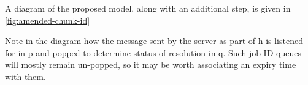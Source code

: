 A diagram of the proposed model, along with an additional  step, is given in \cref{fig:amended-chunk-id}


Note in the diagram how the message sent by the server as part of \textcolor{dark2-1}{h} is listened for in \textcolor{dark2-6}{p} and popped to determine status of resolution in \textcolor{dark2-6}{q}.
Such job ID queues will mostly remain un-popped, so it may be worth associating an expiry time with them.

